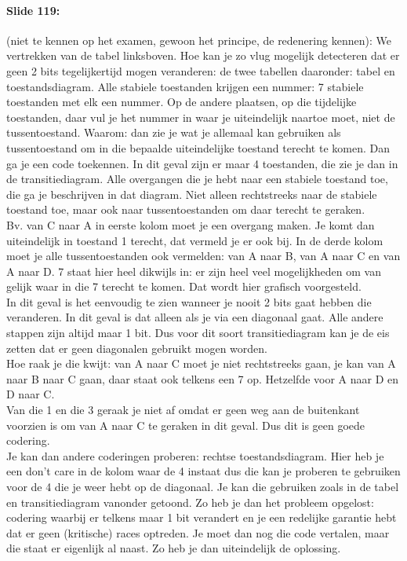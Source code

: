 \documentclass[10pt,a4paper]{book}
\begin{document}
\paragraph{Slide 119:} (niet te kennen op het examen, gewoon het principe, de redenering kennen): We vertrekken van de tabel linksboven. Hoe kan je zo vlug mogelijk detecteren dat er geen 2 bits tegelijkertijd mogen veranderen: de twee tabellen daaronder: tabel en toestandsdiagram. Alle stabiele toestanden krijgen een nummer: 7 stabiele toestanden met elk een nummer. Op de andere plaatsen, op die tijdelijke toestanden, daar vul je het nummer in waar je uiteindelijk naartoe moet, niet de tussentoestand. Waarom: dan zie je wat je allemaal kan gebruiken als tussentoestand om in die bepaalde uiteindelijke toestand terecht te komen. Dan ga je een code toekennen. In dit geval zijn er maar 4 toestanden, die zie je dan in de transitiediagram. Alle overgangen die je hebt naar een stabiele toestand toe, die ga je beschrijven in dat diagram. Niet alleen rechtstreeks naar de stabiele toestand toe, maar ook naar tussentoestanden om daar terecht te geraken.\\
Bv. van C naar A in eerste kolom moet je een overgang maken. Je komt dan uiteindelijk in toestand 1 terecht, dat vermeld je er ook bij. In de derde kolom moet je alle tussentoestanden ook vermelden: van A naar B, van A naar C en van A naar D. 7 staat hier heel dikwijls in: er zijn heel veel mogelijkheden om van gelijk waar in die 7 terecht te komen. Dat wordt hier grafisch voorgesteld.\\
In dit geval is het eenvoudig te zien wanneer je nooit 2 bits gaat hebben die veranderen. In dit geval is dat alleen als je via een diagonaal gaat. Alle andere stappen zijn altijd maar 1 bit. Dus voor dit soort transitiediagram kan je de eis zetten dat er geen diagonalen gebruikt mogen worden.\\
Hoe raak je die kwijt: van A naar C moet je niet rechtstreeks gaan, je kan van A naar B naar C gaan, daar staat ook telkens een 7 op. Hetzelfde voor A naar D en D naar C.\\
Van die 1 en die 3 geraak je niet af omdat er geen weg aan de buitenkant voorzien is om van A naar C te geraken in dit geval. Dus dit is geen goede codering.\\
Je kan dan andere coderingen proberen: rechtse toestandsdiagram. Hier heb je een don't care in de kolom waar de 4 instaat dus die kan je proberen te gebruiken voor de 4 die je weer hebt op de diagonaal. Je kan die gebruiken zoals in de tabel en transitiediagram vanonder getoond. Zo heb je dan het probleem opgelost: codering waarbij er telkens maar 1 bit verandert en je een redelijke garantie hebt dat er geen (kritische) races optreden. Je moet dan nog die code vertalen, maar die staat er eigenlijk al naast. Zo heb je dan uiteindelijk de oplossing.
\end{document}

